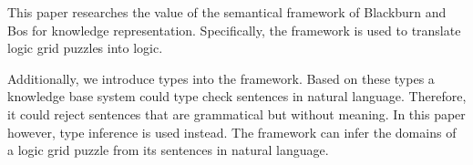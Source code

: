 This paper researches the value of the semantical framework of Blackburn and Bos for knowledge representation. Specifically, the framework is used to translate logic grid puzzles into logic. %

Additionally, we introduce types into the framework. Based on these types a knowledge base system could type check sentences in natural language. Therefore, it could reject sentences that are grammatical but without meaning. In this paper however, type inference is used instead. The framework can infer the domains of a logic grid puzzle from its sentences in natural language.

